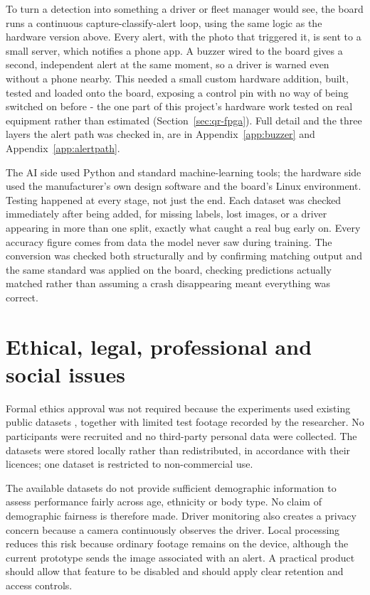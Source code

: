 To turn a detection into something a driver or fleet manager would see, the board runs a continuous capture-classify-alert loop, using the same logic as the hardware version above. Every alert, with the photo that triggered it, is sent to a small server, which notifies a phone app. A buzzer wired to the board gives a second, independent alert at the same moment, so a driver is warned even without a phone nearby. This needed a small custom hardware addition, built, tested and loaded onto the board, exposing a control pin with no way of being switched on before \citep{xilinx2019ug850} - the one part of this project's hardware work tested on real equipment rather than estimated (Section~\ref{sec:qr-fpga}). Full detail and the three layers the alert path was checked in, are in Appendix~\ref{app:buzzer} and Appendix~\ref{app:alertpath}.

The AI side used Python and standard machine-learning tools; the hardware side used the manufacturer's own design software and the board's Linux environment. Testing happened at every stage, not just the end. Each dataset was checked immediately after being added, for missing labels, lost images, or a driver appearing in more than one split, exactly what caught a real bug early on. Every accuracy figure comes from data the model never saw during training. The conversion was checked both structurally and by confirming matching output and the same standard was applied on the board, checking predictions actually matched rather than assuming a crash disappearing meant everything was correct.

\section{Ethical, legal, professional and social issues}

Formal ethics approval was not required because the experiments used existing public datasets \citep{statefarm2016dataset,yang2024samdd,saad2020dataset}, together with limited test footage recorded by the researcher. No participants were recruited and no third-party personal data were collected. The datasets were stored locally rather than redistributed, in accordance with their licences; one dataset is restricted to non-commercial use.

The available datasets do not provide sufficient demographic information to assess performance fairly across age, ethnicity or body type. No claim of demographic fairness is therefore made. Driver monitoring also creates a privacy concern because a camera continuously observes the driver. Local processing reduces this risk because ordinary footage remains on the device, although the current prototype sends the image associated with an alert. A practical product should allow that feature to be disabled and should apply clear retention and access controls.

